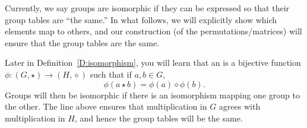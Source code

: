 \documentclass{ximera}
\begin{document}
\begin{remark}
  Currently, we say groups are isomorphic if they can be expressed so
  that their group tables are ``the same.'' In what follows, we will
  explicitly show which elements map to others, and our construction
  (of the permutations/matrices) will ensure that the group tables are
  the same.

  Later in Definition~\ref{D:isomorphism}, you will learn that an
   is a bijective function $\phi:(G,\star)\to
  (H,\diamond)$ such that if $a,b\in G$,
  \[
  \phi(a \star b) = \phi(a) \diamond \phi(b).
  \]
  Groups will then be isomorphic if there is an isomorphism mapping
  one group to the other. The line above ensures that multiplication
  in $G$ agrees with multiplication in $H$, and hence the group tables
  will be the same.
\end{remark}
\end{document}

